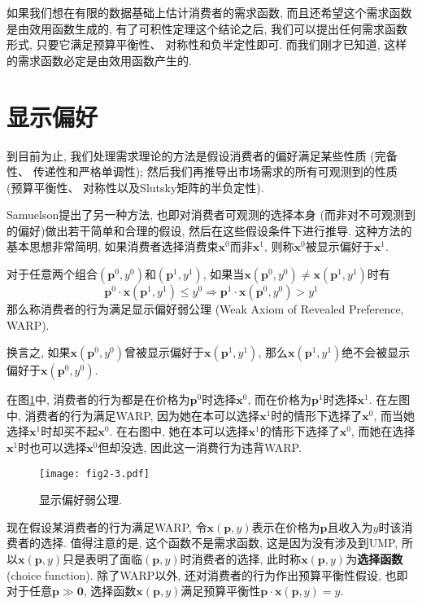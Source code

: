 \documentclass[cn, 12pt, math=mtpro2, bibstyle=apa, blue]{elegantbook}
\newcommand{\p}{\mathbf{p}}
\newcommand{\x}{\mathbf{x}}
\begin{document}
如果我们想在有限的数据基础上估计消费者的需求函数, 而且还希望这个需求函数是由效用函数生成的, 有了可积性定理这个结论之后, 我们可以提出任何需求函数形式, 只要它满足预算平衡性、 对称性和负半定性即可. 而我们刚才已知道, 这样的需求函数必定是由效用函数产生的.
\section{显示偏好}
到目前为止, 我们处理需求理论的方法是假设消费者的偏好满足某些性质 (完备性、 传递性和严格单调性); 然后我们再推导出市场需求的所有可观测到的性质 (预算平衡性、 对称性以及Slutsky矩阵的半负定性).

Samuelson提出了另一种方法, 也即对消费者可观测的选择本身 (而非对不可观测到的偏好)做出若干简单和合理的假设, 然后在这些假设条件下进行推导. 这种方法的基本思想非常简明, 如果消费者选择消费束$\x^0$而非$\x^1$, 则称$\x^0$被显示偏好于$\x^1$.

\begin{definition}
对于任意两个组合$(\p^0,y^0)$和$(\p^1,y^1)$, 如果当$\x(\p^0,y^0)\neq \x(\p^1,y^1)$时有
$$\p^0\cdot\x(\p^1,y^1)\leq y^0\Rightarrow\p^1\cdot\x(\p^0,y^0)>y^1$$
那么称消费者的行为满足显示偏好弱公理 (Weak Axiom of Revealed Preference, WARP).
\end{definition}
换言之, 如果$\x(\p^0,y^0)$曾被显示偏好于$\x(\p^1,y^1)$, 那么$\x(\p^1,y^1)$绝不会被显示偏好于$\x(\p^0,y^0)$.

在图\ref{fig2.3}中, 消费者的行为都是在价格为$\p^0$时选择$\x^0$, 而在价格为$\p^1$时选择$\x^1$. 在左图中, 消费者的行为满足WARP, 因为她在本可以选择$\x^1$时的情形下选择了$\x^0$, 而当她选择$\x^1$时却买不起$\x^0$. 在右图中, 她在本可以选择$\x^1$的情形下选择了$\x^0$, 而她在选择$\x^1$时也可以选择$\x^0$但却没选, 因此这一消费行为违背WARP.

\begin{figure}[htbp!]
  \centering
  \texttt{[image: fig2-3.pdf]}
  \caption{显示偏好弱公理.}\label{fig2.3}
\end{figure}

现在假设某消费者的行为满足WARP, 令$\x(\p,y)$表示在价格为$\p$且收入为$y$时该消费者的选择. 值得注意的是, 这个函数不是需求函数, 这是因为没有涉及到UMP, 所以$\x(\p,y)$只是表明了面临$(\p,y)$时消费者的选择, 此时称$\x(\p,y)$为\textbf{选择函数} (choice function). 除了WARP以外, 还对消费者的行为作出预算平衡性假设, 也即对于任意$\p\gg\mathbf{0}$, 选择函数$\x(\p,y)$满足预算平衡性$\p\cdot\x(\p,y)=y$.
\end{document}
